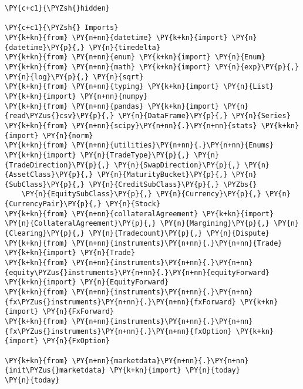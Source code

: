     \begin{tcolorbox}[breakable, size=fbox, boxrule=1pt, pad at break*=1mm,colback=cellbackground, colframe=cellborder]
\begin{Verbatim}[commandchars=\\\{\}]
\PY{c+c1}{\PYZsh{}hidden}

\PY{c+c1}{\PYZsh{} Imports}
\PY{k+kn}{from} \PY{n+nn}{datetime} \PY{k+kn}{import} \PY{n}{datetime}\PY{p}{,} \PY{n}{timedelta}
\PY{k+kn}{from} \PY{n+nn}{enum} \PY{k+kn}{import} \PY{n}{Enum}
\PY{k+kn}{from} \PY{n+nn}{math} \PY{k+kn}{import} \PY{n}{exp}\PY{p}{,} \PY{n}{log}\PY{p}{,} \PY{n}{sqrt}
\PY{k+kn}{from} \PY{n+nn}{typing} \PY{k+kn}{import} \PY{n}{List}
\PY{k+kn}{import} \PY{n+nn}{numpy}
\PY{k+kn}{from} \PY{n+nn}{pandas} \PY{k+kn}{import} \PY{n}{read\PYZus{}csv}\PY{p}{,} \PY{n}{DataFrame}\PY{p}{,} \PY{n}{Series}
\PY{k+kn}{from} \PY{n+nn}{scipy}\PY{n+nn}{.}\PY{n+nn}{stats} \PY{k+kn}{import} \PY{n}{norm}
\PY{k+kn}{from} \PY{n+nn}{utilities}\PY{n+nn}{.}\PY{n+nn}{Enums} \PY{k+kn}{import} \PY{n}{TradeType}\PY{p}{,} \PY{n}{TradeDirection}\PY{p}{,} \PY{n}{SwapDirection}\PY{p}{,} \PY{n}{AssetClass}\PY{p}{,} \PY{n}{MaturityBucket}\PY{p}{,} \PY{n}{SubClass}\PY{p}{,} \PY{n}{CreditSubClass}\PY{p}{,} \PYZbs{}
    \PY{n}{EquitySubClass}\PY{p}{,} \PY{n}{Currency}\PY{p}{,} \PY{n}{CurrencyPair}\PY{p}{,} \PY{n}{Stock}
\PY{k+kn}{from} \PY{n+nn}{collateralAgreement} \PY{k+kn}{import} \PY{n}{CollateralAgreement}\PY{p}{,} \PY{n}{Margining}\PY{p}{,} \PY{n}{Clearing}\PY{p}{,} \PY{n}{Tradecount}\PY{p}{,} \PY{n}{Dispute}
\PY{k+kn}{from} \PY{n+nn}{instruments}\PY{n+nn}{.}\PY{n+nn}{Trade} \PY{k+kn}{import} \PY{n}{Trade}
\PY{k+kn}{from} \PY{n+nn}{instruments}\PY{n+nn}{.}\PY{n+nn}{equity\PYZus{}instruments}\PY{n+nn}{.}\PY{n+nn}{equityForward} \PY{k+kn}{import} \PY{n}{EquityForward}
\PY{k+kn}{from} \PY{n+nn}{instruments}\PY{n+nn}{.}\PY{n+nn}{fx\PYZus{}instruments}\PY{n+nn}{.}\PY{n+nn}{fxForward} \PY{k+kn}{import} \PY{n}{FxForward}
\PY{k+kn}{from} \PY{n+nn}{instruments}\PY{n+nn}{.}\PY{n+nn}{fx\PYZus{}instruments}\PY{n+nn}{.}\PY{n+nn}{fxOption} \PY{k+kn}{import} \PY{n}{FxOption}

\PY{k+kn}{from} \PY{n+nn}{marketdata}\PY{n+nn}{.}\PY{n+nn}{init\PYZus{}marketdata} \PY{k+kn}{import} \PY{n}{today}
\PY{n}{today}
\end{Verbatim}
\end{tcolorbox}

